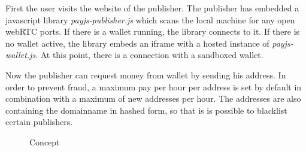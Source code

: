 \documentclass[a4paper]{article}
\begin{document}
First the user visits the website of the publisher. The publisher has embedded a javascript library \textit{payjs-publisher.js} which scans the local machine for any open webRTC ports. If there is a wallet running, the library connects to it. If there is no wallet active, the library embeds an iframe with a hosted instance of \textit{payjs-wallet.js}. At this point, there is a connection with a sandboxed wallet.

Now the publisher can request money from wallet by sending his address. In order to prevent fraud, a maximum pay per hour per address is set by default in combination with a maximum of new addresses per hour. The addresses are also containing the domainname in hashed form, so that is is possible to blacklist certain publishers.


\newpage

\begin{figure}[htbp]
	
	\caption{Concept}
\end{figure}
\end{document}
